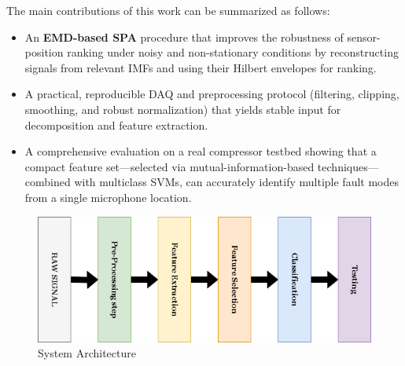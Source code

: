 \documentclass[12pt,a4paper]{article}
\begin{document}
\begin{multicols}{2}
The main contributions of this work can be summarized as follows:
\begin{itemize}
  \item An \textbf{EMD-based SPA} procedure that improves the robustness of sensor-position ranking under noisy and non-stationary conditions by reconstructing signals from relevant IMFs and using their Hilbert envelopes for ranking.
  \item A practical, reproducible DAQ and preprocessing protocol (filtering, clipping, smoothing, and robust normalization) that yields stable input for decomposition and feature extraction.
  \item A comprehensive evaluation on a real compressor testbed showing that a compact feature set—selected via mutual-information-based techniques—combined with multiclass SVMs, can accurately identify multiple fault modes from a single microphone location.
\end{itemize}
\end{multicols}
\begin{figure}[H]
    \centering
    \includegraphics[width=1\linewidth]{Diagrams/icbmintro.drawio.png}
    \caption{System Architecture}
    \label{fig:sysarch}
\end{figure}
\end{document}

